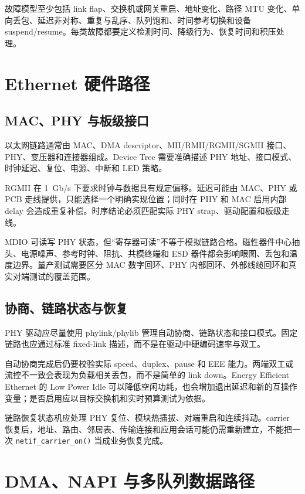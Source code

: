 故障模型至少包括 link flap、交换机或网关重启、地址变化、路径 MTU 变化、单向丢包、延迟非对称、重复与乱序、队列饱和、时间参考切换和设备 suspend/resume。每类故障都要定义检测时间、降级行为、恢复时间和积压处理。

\section{Ethernet 硬件路径}

\subsection{MAC、PHY 与板级接口}

以太网链路通常由 MAC、DMA descriptor、MII/RMII/RGMII/SGMII 接口、PHY、变压器和连接器组成。Device Tree 需要准确描述 PHY 地址、接口模式、时钟延迟、复位、电源、中断和 LED 策略。

RGMII 在 1~Gb/s 下要求时钟与数据具有规定偏移。延迟可能由 MAC、PHY 或 PCB 走线提供，只能选择一个明确实现位置；同时在 PHY 和 MAC 启用内部 delay 会造成重复补偿。时序结论必须匹配实际 PHY strap、驱动配置和板级走线。

MDIO 可读写 PHY 状态，但“寄存器可读”不等于模拟链路合格。磁性器件中心抽头、电源噪声、参考时钟、阻抗、共模终端和 ESD 器件都会影响眼图、丢包和温度边界。量产测试需要区分 MAC 数字回环、PHY 内部回环、外部线缆回环和真实对端测试的覆盖范围。

\subsection{协商、链路状态与恢复}

PHY 驱动应尽量使用 phylink/phylib 管理自动协商、链路状态和接口模式。固定链路也应通过标准 fixed-link 描述，而不是在驱动中硬编码速率与双工。

自动协商完成后仍要校验实际 speed、duplex、pause 和 EEE 能力。两端双工或流控不一致会表现为负载相关丢包，而不是简单的 link down。Energy Efficient Ethernet 的 Low Power Idle 可以降低空闲功耗，也会增加退出延迟和新的互操作变量；是否启用应以目标交换机和实时预算测试为依据。

链路恢复状态机应处理 PHY 复位、模块热插拔、对端重启和连续抖动。carrier 恢复后，地址、路由、邻居表、传输连接和应用会话可能仍需重新建立，不能把一次 \texttt{netif\_carrier\_on()} 当成业务恢复完成。

\section{DMA、NAPI 与多队列数据路径}

